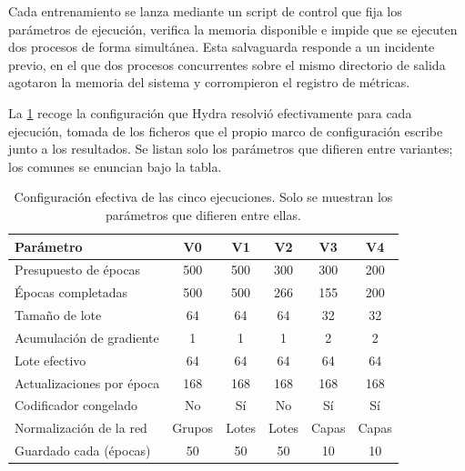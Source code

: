 Cada entrenamiento se lanza mediante un script de control que fija los par\'ametros de
ejecuci\'on, verifica la memoria disponible e impide que se ejecuten dos procesos de forma
simult\'anea. Esta salvaguarda responde a un incidente previo, en el que dos procesos
concurrentes sobre el mismo directorio de salida agotaron la memoria del sistema y
corrompieron el registro de m\'etricas.

La \cref{tab:config-efectiva} recoge la configuraci\'on que Hydra resolvi\'o
efectivamente para cada ejecuci\'on, tomada de los ficheros que el propio marco de
configuraci\'on escribe junto a los resultados. Se listan solo los par\'ametros que
difieren entre variantes; los comunes se enuncian bajo la tabla.

\begin{table}[htbp]
  \centering
  \caption{Configuraci\'on efectiva de las cinco ejecuciones. Solo se muestran los
    par\'ametros que difieren entre ellas.}
  \label{tab:config-efectiva}
  \small
  \begin{tabular}{lccccc}
    \toprule
    Par\'ametro & V0 & V1 & V2 & V3 & V4 \\
    \midrule
    Presupuesto de \'epocas   & \num{500} & \num{500} & \num{300} & \num{300} & \num{200} \\
    \'Epocas completadas      & \num{500} & \num{500} & \num{266} & \num{155} & \num{200} \\
    Tama\~no de lote          & \num{64} & \num{64} & \num{64} & \num{32} & \num{32} \\
    Acumulaci\'on de gradiente & \num{1} & \num{1} & \num{1} & \num{2} & \num{2} \\
    Lote efectivo             & \num{64} & \num{64} & \num{64} & \num{64} & \num{64} \\
    Actualizaciones por \'epoca & \num{168} & \num{168} & \num{168} & \num{168} & \num{168} \\
    Codificador congelado     & No & S\'i & No & S\'i & S\'i \\
    Normalizaci\'on de la red & Grupos & Lotes & Lotes & Capas & Capas \\
    Guardado cada (\'epocas)  & \num{50} & \num{50} & \num{50} & \num{10} & \num{10} \\
    \bottomrule
  \end{tabular}
\end{table}

